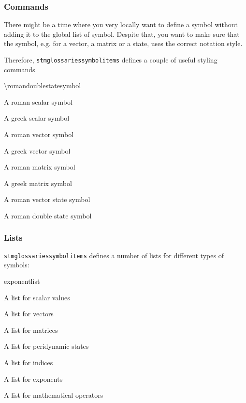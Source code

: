 \documentclass{scrartcl}
\begin{document}
\subsubsection{Commands}
\label{sec:usage:document:symbols:commands}

There might be a time where you very locally want to define a symbol without adding it to the global list of symbol. Despite that, you want to make sure that the symbol, e.g. for a vector, a matrix or a state, uses the correct notation style.

Therefore, \texttt{stmglossariessymbolitems} defines a couple of useful styling commands

\begin{labeling}{\textbackslash romandoublestatesymbol}
\item [\textbackslash romanscalarsymbol] A roman scalar symbol
\item [\textbackslash greekscalarsymbol] A greek scalar symbol
\item [\textbackslash romanvectorsymbol] A roman vector symbol
\item [\textbackslash greekvectorsymbol] A greek vector symbol
\item [\textbackslash romanmatrixsymbol] A roman matrix symbol
\item [\textbackslash scalarstatesymbol] A greek matrix symbol
\item [\textbackslash romanvectorstatesymbol] A roman vector state symbol
\item [\textbackslash romandoublestatesymbol] A roman double state symbol
\end{labeling}

\subsubsection{Lists}
\label{sec:usage:symbols:document:lists}

\texttt{stmglossariessymbolitems} defines a number of lists for different types of symbols:

\begin{labeling}{exponentlist}
\item [scalarlist] A list for scalar values
\item [vectorlist] A list for vectors
\item [matrixlist] A list for matrices
\item [statelist] A list for peridynamic states
\item [indexlist] A list for indices
\item [exponentlist] A list for exponents
\item [operatorlist] A list for mathematical operators
\end{labeling}
\end{document}
